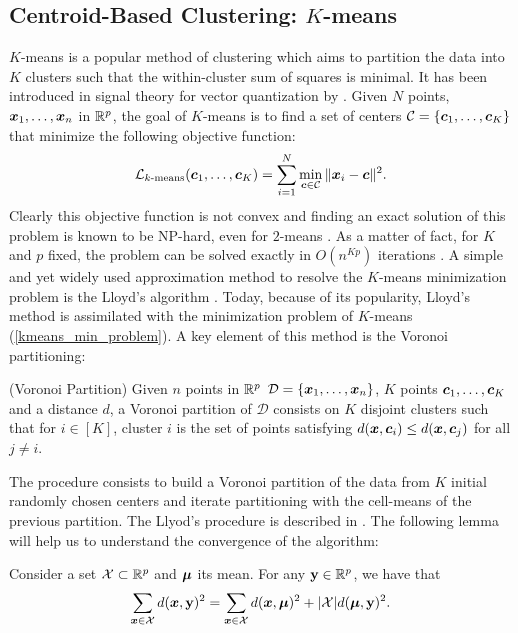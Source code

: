 \subsection{Centroid-Based Clustering: $K$-means}
$K$-means is a popular method of clustering which aims to partition the data into $K$ clusters such that the within-cluster sum of squares is minimal. It has been introduced in signal theory for vector quantization by \citep{macqueen1967}. Given $N$ points, $\boldsymbol x_1,\dots,\boldsymbol x_n$ in ${\mathbb R}^p$, the goal of $K$-means is to find a set of centers $\mathcal{C}=\{\boldsymbol c_1,\dots,\boldsymbol c_K\}$ that minimize the following objective function:
\begin{equation}
  \mathcal{L}_{k\textnormal{-means}}(\boldsymbol c_1,\dots,\boldsymbol c_K)=\sum_{i=1}^N\min_{\boldsymbol c \in \mathcal{C}}\|\boldsymbol x_i - \boldsymbol c \|^2.
  \label{kmeans_min_problem}
\end{equation}
Clearly this objective function is not convex and finding an exact solution of this problem is known to be NP-hard, even for $2$-means \citep{dasgupta2008hardness,Aloise:2009:NES:1519378.1519389}. As a matter of fact, for $K$ and $p$ fixed, the problem can be solved exactly in $O(n^{Kp})$ iterations \citep{Inaba:1994:AWV:177424.178042}. A simple and yet widely used approximation method to resolve the $K$-means minimization problem is the Lloyd's algorithm \citep{lloyd1982}. Today, because of its popularity, Lloyd's method is assimilated with the minimization problem of $K$-means (\cref{kmeans_min_problem}). A key element of this method is the Voronoi partitioning:
\begin{defi}{(Voronoi Partition)} 
Given $n$ points in ${\mathbb R}^p$ $\mathcal{D}=\{\boldsymbol x_1,\dots,\boldsymbol x_n\}$, $K$ points $\boldsymbol c_1,\dots,\boldsymbol c_K$ and a distance $d$, a Voronoi partition of $\mathcal{D}$ consists on $K$ disjoint clusters such that for $i\in[K]$, cluster $i$ is the set of points satisfying $d(\boldsymbol x, \boldsymbol c_i) \leq d(\boldsymbol x, \boldsymbol c_j)$ for all $j\neq i$.
\end{defi}
The procedure consists to build a Voronoi partition of the data from $K$ initial randomly chosen centers and iterate partitioning with the cell-means of the previous partition. The Llyod's procedure is described in . The following lemma will help us to understand the convergence of the algorithm:
\begin{lemma}
Consider a set $\mathcal{X} \subset{\mathbb R}^p$ and $\boldsymbol\mu$ its mean. For any $\mathbf y\in {\mathbb R}^p$, we have that 
\begin{equation}
  \sum_{\boldsymbol x \in \mathcal{X}} d(\boldsymbol x,\mathbf y)^2 = \sum_{\boldsymbol x\in\mathcal{X}}d(\boldsymbol x,\boldsymbol\mu)^2 + |\mathcal{X}|d(\boldsymbol\mu,\mathbf y)^2.
\end{equation}
\label{lemma_lloyd_decr_cost}
\end{lemma}
